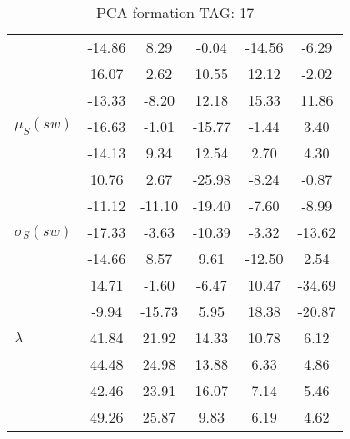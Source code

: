 \begin{table}[h!]
\begin{center}
\begin{tabular}{| l || c | c | c | c | c |}
 & -14.86  & 8.29  & -0.04  & -14.56  & -6.29 \\
 & 16.07  & 2.62  & 10.55  & 12.12  & -2.02 \\
 & -13.33  & -8.20  & 12.18  & 15.33  & 11.86 \\\hline
$\mu_S(sw)$ & -16.63  & -1.01  & -15.77  & -1.44  & 3.40 \\
 & -14.13  & 9.34  & 12.54  & 2.70  & 4.30 \\
 & 10.76  & 2.67  & -25.98  & -8.24  & -0.87 \\
 & -11.12  & -11.10  & -19.40  & -7.60  & -8.99 \\\hline
$\sigma_S(sw)$ & -17.33  & -3.63  & -10.39  & -3.32  & -13.62 \\
 & -14.66  & 8.57  & 9.61  & -12.50  & 2.54 \\
 & 14.71  & -1.60  & -6.47  & 10.47  & -34.69 \\
 & -9.94  & -15.73  & 5.95  & 18.38  & -20.87 \\\hline\hline
$\lambda$ & 41.84  & 21.92  & 14.33  & 10.78  & 6.12 \\
 & 44.48  & 24.98  & 13.88  & 6.33  & 4.86 \\
 & 42.46  & 23.91  & 16.07  & 7.14  & 5.46 \\
 & 49.26  & 25.87  & 9.83  & 6.19  & 4.62 \\\hline
\end{tabular}
\caption{PCA formation TAG: 17}
\end{center}
\end{table}